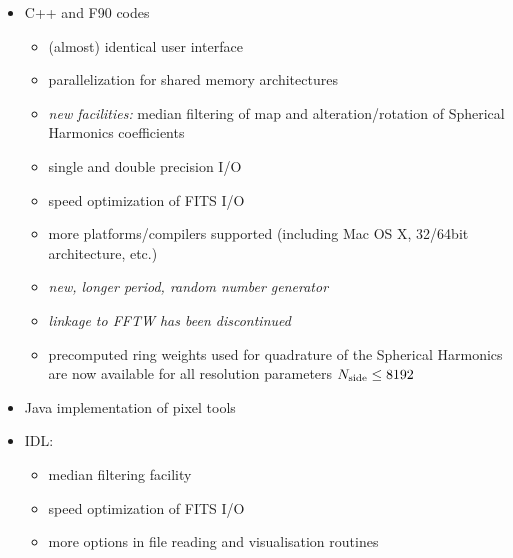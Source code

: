 \documentclass[12pt,twoside]{article}
\begin{document}
{{\begin{itemize}
\begin{itemize}
\begin{itemize}
  Please note that only the most recent CVS versions of gfortran (Aug 2005 and later) compile HEALPix correctly!
\item g95 compiler available for Linux, Mac OSX, Windows, Sun and HP platforms
  \hfill \\ 
\end{itemize}
\end{itemize}
  \item C++ and F90 codes
\begin{itemize}
\item (almost) identical user interface
\item parallelization for shared memory architectures
\item {\em new facilities:} median filtering of \healpix map and alteration/rotation
of Spherical Harmonics coefficients
\item single and double precision I/O
\item speed optimization of FITS I/O
\item more platforms/compilers supported (including Mac OS X, 32/64bit architecture, etc.)
\item {\em new, longer period, random number generator}
\item {\em linkage to FFTW has been discontinued}
\item precomputed ring weights used for quadrature of the Spherical Harmonics
are now available for all resolution parameters $N_{\rm side} \le 8192$
\end{itemize}
\item Java implementation of pixel tools
\item IDL: 
\begin{itemize}
\item median filtering facility
\item speed optimization of FITS I/O
\item more options in file reading and visualisation routines 
\end{itemize}

\end{itemize}

}}
\end{document}
